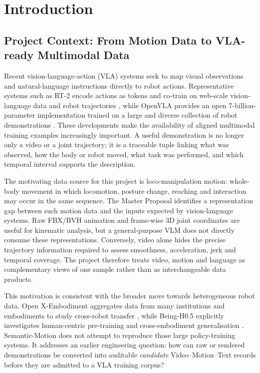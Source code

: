 \documentclass[11pt,oneside]{report}
\begin{document}
\tableofcontents
\listoffigures
\listoftables

\mainmatterstyle

\chapter{Introduction}
\section{Project Context: From Motion Data to VLA-ready Multimodal Data}
Recent vision-language-action (VLA) systems seek to map visual observations and
natural-language instructions directly to robot actions. Representative systems
such as RT-2 encode actions as tokens and co-train on web-scale vision-language
data and robot trajectories \cite{zitkovich2023rt2}, while OpenVLA provides an
open 7-billion-parameter implementation trained on a large and diverse
collection of robot demonstrations \cite{kim2024openvla}. These developments
make the availability of aligned multimodal training examples increasingly
important. A useful demonstration is no longer only a video or a joint
trajectory; it is a traceable tuple linking what was observed, how the body or
robot moved, what task was performed, and which temporal interval supports the
description.

The motivating data source for this project is loco-manipulation motion:
whole-body movement in which locomotion, posture change, reaching and
interaction may occur in the same sequence. The Master Proposal identifies a
representation gap between such motion data and the inputs expected by
vision-language systems. Raw FBX/BVH animation and frame-wise 3D joint
coordinates are useful for kinematic analysis, but a general-purpose VLM does
not directly consume these representations. Conversely, video alone hides the
precise trajectory information required to assess smoothness, acceleration,
jerk and temporal coverage. The project therefore treats video, motion and
language as complementary views of one sample rather than as interchangeable
data products.

This motivation is consistent with the broader move towards heterogeneous
robot data. Open X-Embodiment aggregates data from many institutions and
embodiments to study cross-robot transfer \cite{openx2024}, while Being-H0.5
explicitly investigates human-centric pre-training and cross-embodiment
generalisation \cite{luo2026beingh05}. Semantic-Motion does not attempt to
reproduce those large policy-training systems. It addresses an earlier
engineering question: how can raw or rendered demonstrations be converted into
auditable \emph{candidate} Video--Motion--Text records before they are admitted
to a VLA training corpus?
\end{document}
